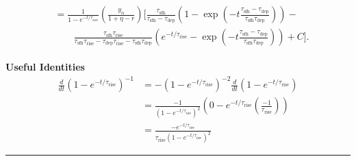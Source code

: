 \documentclass[12pt]{article}
\newcommand{\timescale}[1]{\ensuremath{\tau_\text{#1}}}
\begin{document}
\begin{subequations}
\begin{align}
\begin{split} %
&= \frac{1}{1 - e^{-t / \timescale{rise}}}
\left(\frac{y_\alpha}{1 + \eta - r}\right)
\bigg[\frac{
	\timescale{sfh}
}{
	\timescale{sfh} - \timescale{dep}
} \left(
1 - \exp\left(-t\frac{
	\timescale{sfh} - \timescale{dep}
}{
	\timescale{sfh}\timescale{dep}
}\right)
\right) -
\\
&\qquad \frac{
	\timescale{sfh}\timescale{rise}
}{
	\timescale{sfh}\timescale{rise} - \timescale{dep}\timescale{rise} -
	\timescale{sfh}\timescale{dep}
} \left(e^{-t / \timescale{rise}} -
\exp\left(-t
\frac{
	\timescale{sfh} - \timescale{dep}
}{
	\timescale{sfh}\timescale{dep}
}
\right)
\right) + C\bigg].
\end{split}
\label{eq:zalpha-full}
\end{align}\end{subequations}




















\newpage
\noindent
\textbf{Useful Identities}
\begin{subequations}\begin{align}
\frac{d}{dt}\left(1 - e^{-t / \timescale{rise}}\right)^{-1} &=
-\left(1 - e^{-t / \timescale{rise}}\right)^{-2}
\frac{d}{dt}\left(1 - e^{-t / \timescale{rise}}\right)
\\
&= \frac{-1}{\left(1 - e^{-t / \timescale{rise}}\right)^2}
\left(0 - e^{-t / \timescale{rise}}\left(\frac{-1}{\timescale{rise}}\right)
\right)
\\
&= \frac{
	-e^{-t / \timescale{rise}}
}{
	\timescale{rise} \left(1 - e^{-t / \timescale{rise}}\right)^2
}
\end{align}\end{subequations}

\par\null\par
\begin{center}
\rule[0.7\baselineskip]{0.5\textwidth}{0.4pt}
\end{center}
\end{document}
